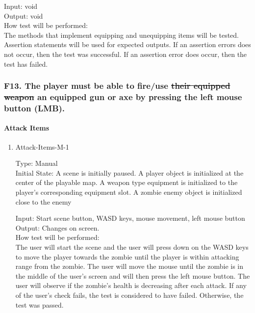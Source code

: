 \documentclass[12pt, titlepage]{article}
\DeclareRobustCommand{\hsout}[1]{\texorpdfstring{\sout{#1}}{#1}}
\newcounter{ftnum}
\begin{document}
\begin{enumerate}
{\color{magenta} Input: void}\\
					
{\color{magenta} Output: void}\\
					
{\color{magenta} How test will be performed:}\\{\color{magenta} The methods that implement equipping and unequipping items will be tested. Assertion statements will be used for expected outputs. If an assertion errors does not occur, then the test was successful. If an assertion error does occur, then the test has failed.} \\

\end{enumerate}

\subsubsection{{\color{magenta} F13.} The player must be able to fire/use \hsout{their equipped weapon} {\color{magenta} an equipped gun or axe} by pressing the left mouse button (LMB).} 

\paragraph{Attack Items}

\begin{enumerate}

\item{Attack-Items-M-1\\}  \label{F13-1}

Type: Manual \\
					
Initial State: A scene is initially paused. A player object is initialized at the center of the playable map. A weapon type equipment is initialized to the player's corresponding equipment slot. A zombie enemy object is initialized close to the enemy
					
Input: Start scene button, WASD keys, mouse movement, left mouse button\\
					
Output: Changes on screen.\\
					
How test will be performed:\\ The user will start the scene and the user will press down on the WASD keys to move the player towards the zombie until the player is within attacking range from the zombie. The user will move the mouse until the zombie is in the middle of the user's screen and will then press the left mouse button. The user will observe if the zombie's health is decreasing after each attack. If any of the user's check fails, the test is considered to have failed. Otherwise, the test was passed.

\end{enumerate}
\end{document}
